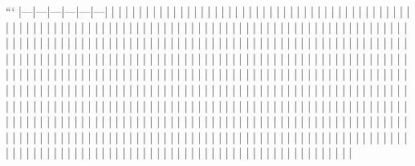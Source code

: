 ```
|---|---|---|---|---|---|
|    |    |    |    |    |    |
|    |    |    |    |    |    |
|    |    |    |    |    |    |
|    |    |    |    |    |    |
|    |    |    |    |    |    |
|    |    |    |    |    |    |
|    |    |    |    |    |    |
|    |    |    |    |    |    |
|    |    |    |    |    |    |
|    |    |    |    |    |    |
|    |    |    |    |    |    |
|    |    |    |    |    |    |
|    |    |    |    |    |    |
|    |    |    |    |    |    |
|    |    |    |    |    |    |
|    |    |    |    |    |    |
|    |    |    |    |    |    |
|    |    |    |    |    |    |
|    |    |    |    |    |    |
|    |    |    |    |    |    |
|    |    |    |    |    |    |
|    |    |    |    |    |    |
|    |    |    |    |    |    |
|    |    |    |    |    |    |
|    |    |    |    |    |    |
|    |    |    |    |    |    |
|    |    |    |    |    |    |
|    |    |    |    |    |    |
|    |    |    |    |    |    |
|    |    |    |    |    |    |
|    |    |    |    |    |    |
|    |    |    |    |    |    |
|    |    |    |    |    |    |
|    |    |    |    |    |    |
|    |    |    |    |    |    |
|    |    |    |    |    |    |
|    |    |    |    |    |    |
|    |    |    |    |    |    |
|    |    |    |    |    |    |
|    |    |    |    |    |    |
|    |    |    |    |    |    |
|    |    |    |    |    |    |
|    |    |    |    |    |    |
|    |    |    |    |    |    |
|    |    |    |    |    |    |
|    |    |    |    |    |    |
|    |    |    |    |    |    |
|    |    |    |    |    |    |
|    |    |    |    |    |    |
|    |    |    |    |    |    |
|    |    |    |    |    |    |
|    |    |    |    |    |    |
|    |    |    |    |    |    |
|    |    |    |    |    |    |
|    |    |    |    |    |    |
|    |    |    |    |    |    |
|    |    |    |    |    |    |
|    |    |    |    |    |    |
|    |    |    |    |    |    |
|    |    |    |    |    |    |
|    |    |    |    |    |    |
|    |    |    |    |    |    |
|    |    |    |    |    |    |
|    |    |    |    |    |    |
|    |    |    |    |    |    |
|    |    |    |    |    |    |
|    |    |    |    |    |    |
|    |    |    |    |    |    |
|    |    |    |    |    |    |
|    |    |    |    |    |    |
|    |    |    |    |    |    |
|    |    |    |    |    |    |
|    |    |    |    |    |    |
|    |    |    |    |    |    |
|    |    |    |    |    |    |
|    |    |    |    |    |    |
|    |    |    |    |    |    |
|    |    |    |    |    |    |
|    |    |    |    |    |    |
|    |    |    |    |    |    |
|    |    |    |    |    |    |
